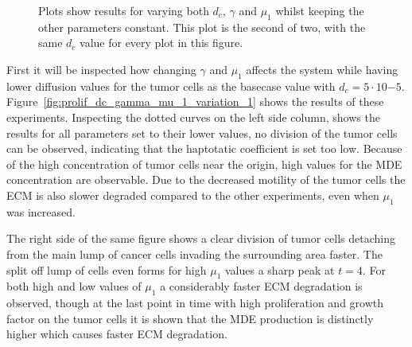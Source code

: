 \begin{figure}[h!]
    \centering
    \caption{Plots show results for varying both $d_c$, $\gamma$ and $\mu_1$ whilst keeping the other parameters constant. This plot is the second of two, with the same $d_c$ value for every plot in this figure.}
    \label{fig:prolif_dc_gamma_mu_1_variation_2}
\end{figure}

First it will be inspected how changing $\gamma$ and $\mu_1$ affects the system while having lower diffusion values for the tumor cells as the basecase value with $d_c=5\cdot 10{-5}$. Figure~\ref{fig:prolif_dc_gamma_mu_1_variation_1} shows the results of these experiments. Inspecting the dotted curves on the left side column, shows the results for all parameters set to their lower values, no division of the tumor cells can be observed, indicating that the haptotatic coefficient is set too low. Because of the high concentration of tumor cells near the origin, high values for the MDE concentration are observable. Due to the decreased motility of the tumor cells the ECM is also slower degraded compared to the other experiments, even when $\mu_1$ was increased. 

The right side of the same figure shows a clear division of tumor cells detaching from the main lump of cancer cells invading the surrounding area faster. The split off lump of cells even forms for high $\mu_1$ values a sharp peak at $t=4$. For both high and low values of $\mu_1$ a considerably faster ECM degradation is observed, though at the last point in time with high proliferation and growth factor on the tumor cells it is shown that the MDE production is distinctly higher which causes faster ECM degradation.

